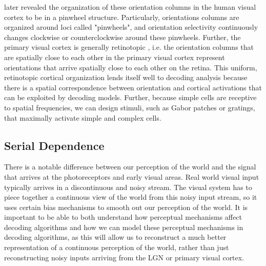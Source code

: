 \documentclass[../main.tex]{subfiles}
\begin{document}
\cite{Yacoub10607} later revealed the organization of these orientation columns in the human visual cortex to be in a pinwheel structure. Particularly, orientations columns are organized around loci called "pinwheels", and orientation selectivity continuously changes clockwise or counterclockwise around these pinwheels. Further, the primary visual cortex is generally retinotopic \citep{Engel_97}, i.e. the orientation columns that are spatially close to each other in the primary visual cortex represent orientations that arrive spatially close to each other on the retina. This uniform, retinotopic cortical organization lends itself well to decoding analysis because there is a spatial correspondence between orientation and cortical activations that can be exploited by decoding models. Further, because simple cells are receptive to spatial frequencies, we can design stimuli, such as Gabor patches or gratings, that maximally activate simple and complex cells. 

\subsection{Serial Dependence}
There is a notable difference between our perception of the world and the signal that arrives at the photoreceptors and early visual areas. Real world visual input typically arrives in a discontinuous and noisy stream. The visual system has to piece together a continuous view of the world from this noisy input stream, so it uses certain bias mechanisms to smooth out our perception of the world. It is important to be able to both understand how perceptual mechanisms affect decoding algorithms and how we can model these perceptual mechanisms in decoding algorithms, as this will allow us to reconstruct a much better representation of a continuous perception of the world, rather than just reconstructing noisy inputs arriving from the LGN or primary visual cortex.
\end{document}
